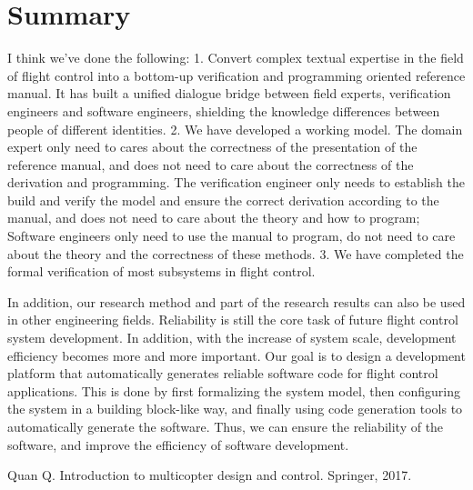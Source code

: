 \documentclass{article} %
\numberwithin{equation}{section} %
\begin{document}
\section{Summary}
I think we've done the following:
1. Convert complex textual expertise in the field of flight control into a bottom-up verification and programming oriented reference manual.
It has built a unified dialogue bridge between field experts, verification engineers and software engineers, shielding the knowledge differences between people of different identities.
2. We have developed a working model. 
The domain expert only need to cares about the correctness of the presentation of the reference manual, and does not need to care about the correctness of the derivation and programming.
The verification engineer only needs to establish the build and verify the model and ensure the correct derivation according to the manual, and does not need to care about the theory and how to program;
Software engineers only need to use the manual to program, do not need to care about the theory and the correctness of these methods.
3. We have completed the formal verification of most subsystems in flight control.

In addition, our research method and part of the research results can also be used in other engineering fields.
Reliability is still the core task of future flight control system development. 
In addition, with the increase of system scale, development efficiency becomes more and more important.
Our goal is to design a development platform that automatically generates reliable software code for flight control applications.
This is done by first formalizing the system model, then configuring the system in a building block-like way, and finally using code generation tools to automatically generate the software.
Thus, we can ensure the reliability of the software, and improve the efficiency of software development.


\begin{thebibliography}{99}
 Quan Q. Introduction to multicopter design and control. Springer, 2017.
\end{thebibliography}
\end{document}
